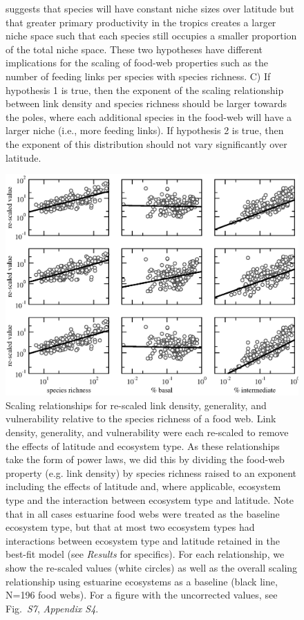 \documentclass[12pt]{article}
\begin{document}
\begin{figure}[h]
{suggests that species will have constant niche sizes over latitude but that greater primary productivity 
in the tropics creates a larger niche space such that each species still occupies a smaller proportion 
of the total niche space. These two hypotheses have different implications for the scaling of food-web 
properties such as the number of feeding links per species with species richness. C) If hypothesis 1 is 
true, then the exponent of the scaling relationship between link density and species richness should 
be larger towards the poles, where each additional species in the food-web will have a larger niche 
(i.e., more feeding links). If hypothesis 2 is true, then the exponent of this distribution should 
not vary significantly over latitude.}
\label{concept}
\end{figure}


\begin{figure}[h]
\centerline{\includegraphics*[height=.5\textheight]{Figures/by_TL/scaling_with_S/proportions/STL_fitlines_nonts.eps}}
\caption{
Scaling relationships for re-scaled link density, generality, and vulnerability 
relative to the species richness of a food web. Link density, generality,
and vulnerability were each re-scaled to remove the effects of latitude and ecosystem
type. As these relationships take the form of power laws, we did this by dividing the food-web
property (e.g. link density) by species richness raised to an exponent including the 
effects of latitude and, where applicable, ecosystem type and the interaction between ecosystem
type and latitude. Note that in all cases estuarine food webs were treated as the baseline 
ecosystem type, but that at most two ecosystem types had interactions between ecosystem type and
latitude retained in the best-fit model (see \emph{Results} for specifics). For each relationship, 
we show the re-scaled values (white circles) as well as the overall scaling relationship using estuarine
ecosystems as a baseline (black line, N=196 food webs). For a figure with the uncorrected values,
see Fig.~\emph{S7}, \emph{Appendix S4}.}
\label{props_v_lat}
\end{figure}
\end{document}

